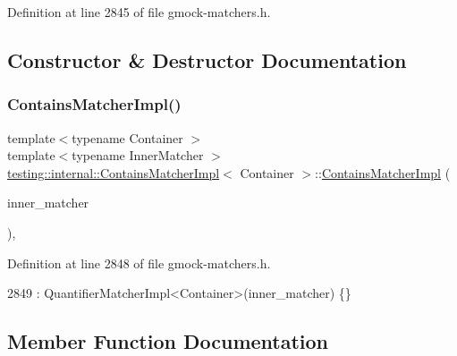 Definition at line 2845 of file gmock-\/matchers.\+h.



\subsection{Constructor \& Destructor Documentation}
\mbox{\label{classtesting_1_1internal_1_1ContainsMatcherImpl_a3fd56f21081068101a76ebe05fc1d7f4}} 
\subsubsection{\texorpdfstring{Contains\+Matcher\+Impl()}{ContainsMatcherImpl()}}
{\footnotesize\ttfamily template$<$typename Container $>$ \\
template$<$typename Inner\+Matcher $>$ \\
\hyperlink{classtesting_1_1internal_1_1ContainsMatcherImpl}{testing\+::internal\+::\+Contains\+Matcher\+Impl}$<$ Container $>$\+::\hyperlink{classtesting_1_1internal_1_1ContainsMatcherImpl}{Contains\+Matcher\+Impl} (\begin{DoxyParamCaption}\item[{Inner\+Matcher}]{inner\+\_\+matcher }\end{DoxyParamCaption})\hspace{0.3cm}{\ttfamily [inline]}, {\ttfamily [explicit]}}



Definition at line 2848 of file gmock-\/matchers.\+h.


\begin{DoxyCode}
2849       : QuantifierMatcherImpl<Container>(inner\_matcher) \{\}
\end{DoxyCode}


\subsection{Member Function Documentation}
\mbox{\label{classtesting_1_1internal_1_1ContainsMatcherImpl_a9d7867110ba3f346399f23e41cc75c5b}} 
